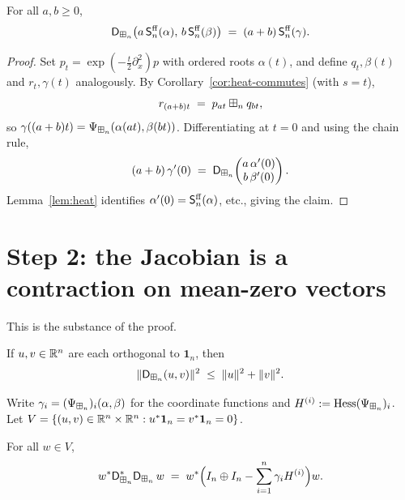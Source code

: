 \begin{qfourobservation}\label{obs:scores}
For all $a,b\ge0$,
\[
\mathsf{D}_{\boxplus_n}\bigl(a\,\mathsf{S}^{\mathrm{ff}}_n(\alpha),\,b\,\mathsf{S}^{\mathrm{ff}}_n(\beta)\bigr)\;=\;(a+b)\,\mathsf{S}^{\mathrm{ff}}_n(\gamma).
\]
\end{qfourobservation}

\begin{proof}
Set $p_t=\exp(-\tfrac t2\partial_x^2)p$ with ordered roots $\alpha(t)$, and
define $q_t,\beta(t)$ and $r_t,\gamma(t)$ analogously.
By Corollary~\ref{cor:heat-commutes} (with $s=t$),
\[
r_{(a+b)t}\;=\;p_{at}\boxplus_n q_{bt},
\]
so $\gamma((a+b)t)=\Psi_{\boxplus_n}(\alpha(at),\beta(bt))$. Differentiating at
$t=0$ and using the chain rule,
\[
(a+b)\,\gamma'(0)\;=\;\mathsf{D}_{\boxplus_n}\!\begin{pmatrix} a\,\alpha'(0)\\ b\,\beta'(0)\end{pmatrix}.
\]
Lemma~\ref{lem:heat} identifies $\alpha'(0)=\mathsf{S}^{\mathrm{ff}}_n(\alpha)$, etc., giving the
claim.
\end{proof}

\section*{Step 2: the Jacobian is a contraction on mean-zero vectors}

This is the substance of the proof.

\begin{qfourproposition}\label{prop:contraction}
If $u,v\in\mathbb{R}^n$ are each orthogonal to $\mathbf 1_n$, then
\[
\|\mathsf{D}_{\boxplus_n}(u,v)\|^2\;\le\;\|u\|^2+\|v\|^2.
\]
\end{qfourproposition}

Write $\gamma_i=(\Psi_{\boxplus_n})_i(\alpha,\beta)$ for the coordinate functions and
$H^{(i)}:=\operatorname{Hess}(\Psi_{\boxplus_n})_i$. Let
$V=\{(u,v)\in\mathbb{R}^n\times\mathbb{R}^n:u^\ast\mathbf 1_n=v^\ast\mathbf 1_n=0\}$.

\begin{qfourlemma}\label{lem:hess}
For all $w\in V$,
\[
w^\ast \mathsf{D}_{\boxplus_n}^\ast\mathsf{D}_{\boxplus_n}\, w
\;=\;w^\ast\Bigl(I_n\oplus I_n-\sum_{i=1}^n\gamma_i H^{(i)}\Bigr)w.
\]
\end{qfourlemma}

